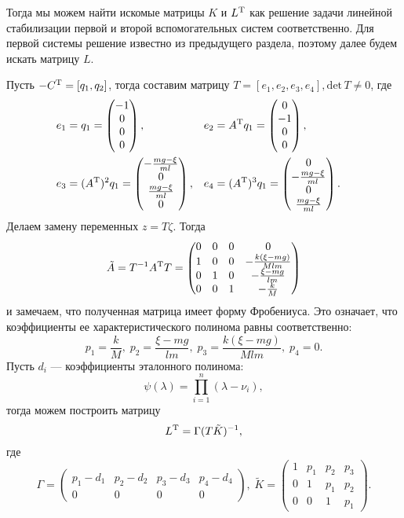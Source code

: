 Тогда мы можем найти искомые матрицы $K$ и $L^\mathrm{T}$ как решение задачи линейной стабилизации первой и второй вспомогательных систем соответственно.
Для первой системы решение известно из предыдущего раздела, поэтому далее будем искать матрицу $L$.

Пусть $-C^\mathrm{T} = [q_1, q_2]$, тогда составим матрицу $T = [e_1, e_2, e_3, e_4], \mathrm{det}\,T \neq 0$, где
$$
	\begin{aligned}
	&e_1 = q_1         = \begin{pmatrix}-1\\0\\0\\0\end{pmatrix},
	&&e_2 = A^\mathrm{T} q_1     = \begin{pmatrix}0\\-1\\0\\0\end{pmatrix},
	\\
	&e_3 = (A^\mathrm{T})^2 q_1 = \begin{pmatrix}-\frac{mg-\xi}{ml}\\0\\\frac{mg-\xi}{ml}\\0\end{pmatrix},
	&&e_4 = (A^\mathrm{T})^3 q_1 = \begin{pmatrix}0\\-\frac{mg-\xi}{ml}\\0\\\frac{mg-\xi}{ml}\end{pmatrix}.&
	\end{aligned}
$$
Делаем замену переменных $z = T\zeta$. Тогда
$$
	\tilde A = T^{-1}A^\mathrm{T} T = \begin{pmatrix}
		0 & 0 & 0 & 0 \\
		1 & 0 & 0 & -\frac{k(\xi - mg)}{Mlm} \\
		0 & 1 & 0 & -\frac{\xi - mg}{lm} \\
		0 & 0 & 1 & -\frac{k}{M}
	\end{pmatrix}
$$
и замечаем, что полученная матрица имеет форму Фробениуса. Это означает, что коэффициенты ее характеристического полинома равны соответственно:
$$
	p_1 = \frac{k}{M},\; p_2 = \frac{\xi - mg}{lm},\; p_3 = \frac{k(\xi - mg)}{Mlm}, \;p_4 = 0.
$$
Пусть $d_i$ --- коэффициенты эталонного полинома:
$$
	\psi(\lambda) = \prod_{i = 1}^{n} (\lambda - \nu_i),
$$
тогда можем построить матрицу
$$
	L^\mathrm{T} = \Gamma(T\tilde K)^{-1},
$$
где
$$
	\Gamma = \begin{pmatrix}p_1 - d_1 & p_2 - d_2 & p_3 - d_3 & p_4 - d_4 \\
		0 & 0 & 0 & 0
		\end{pmatrix},\;
	\tilde K = \begin{pmatrix}1 & p_1 & p_2 & p_3 \\
		0 & 1 & p_1 & p_2 \\
		0 & 0 & 1 & p_1
	\end{pmatrix}.
$$